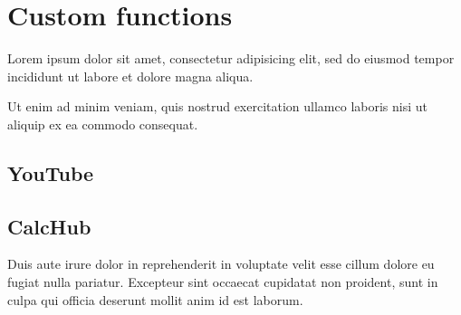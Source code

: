 
\chapter{Custom functions}
Lorem ipsum dolor sit amet, consectetur adipisicing elit, sed do eiusmod tempor incididunt ut labore et dolore magna aliqua.

Ut enim ad minim veniam, quis nostrud exercitation ullamco laboris nisi ut aliquip ex ea commodo consequat.

\section{YouTube}


\section{CalcHub}

Duis aute irure dolor in reprehenderit in voluptate velit esse cillum dolore eu fugiat nulla pariatur. Excepteur sint occaecat cupidatat non proident, sunt in culpa qui officia deserunt mollit anim id est laborum. 



